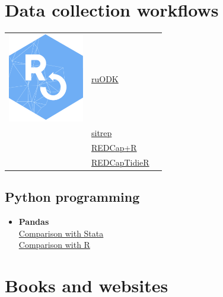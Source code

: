 \documentclass[
  letterpaper,
  DIV=11,
  numbers=noendperiod,
  oneside]{scrreprt}
\providecommand{\tightlist}{%
  \setlength{\itemsep}{0pt}\setlength{\parskip}{0pt}}\usepackage{longtable,booktabs,array}
\begin{document}
\hypertarget{data-collection-workflows}{%
\section{Data collection workflows}\label{data-collection-workflows}}

\begin{longtable}[]{@{}
  >{\raggedright\arraybackslash}p{}
  >{\raggedright\arraybackslash}p{}
  >{\raggedright\arraybackslash}p{}@{}}
\toprule\noalign{}
\endhead
\bottomrule\noalign{}
\endlastfoot
\includegraphics[width=1.30208in,height=\textheight]{images/logo.png} &
\href{https://docs.ropensci.org/ruODK/index.html}{ruODK} & \\
& \href{https://github.com/R4EPI/sitrep}{sitrep} & \\
&
\href{https://stephan-kadauke.quarto.pub/redcap-and-r-redcapcon2023/}{REDCap+R}
& \\
&
\href{https://github.com/CHOP-CGTInformatics/REDCapTidieR}{REDCapTidieR}
& \\
\end{longtable}

\hypertarget{python-programming}{%
\subsection{Python programming}\label{python-programming}}

\begin{itemize}
\tightlist
\item
  \textbf{Pandas}\\
  \href{https://pandas.pydata.org/docs/getting_started/comparison/comparison_with_stata.html}{Comparison
  with Stata}\\
  \href{https://pandas.pydata.org/docs/getting_started/comparison/comparison_with_r.html}{Comparison
  with R}
\end{itemize}

\hypertarget{books-and-websites}{%
\section{Books and websites}\label{books-and-websites}}
\end{document}
